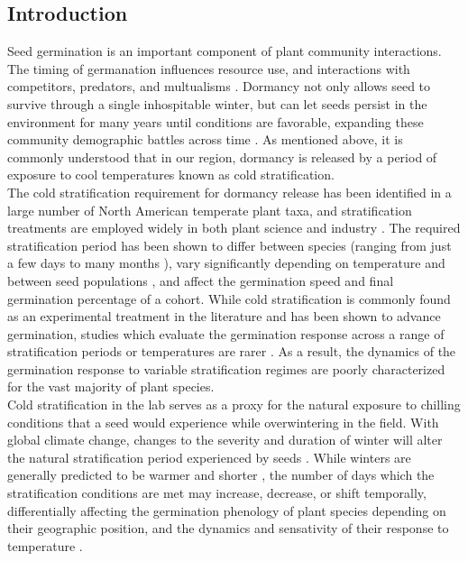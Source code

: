 \documentclass[12pt]{article}\usepackage[]{graphicx}\usepackage[]{color}
\begin{document}
\subsection*{Introduction}
\indent\indent Seed germination is an important component of plant community interactions. The timing of germanation influences resource use, and interactions with competitors, predators, and multualisms \citep{Korner2008,Rathcke1985,Gioria2018}. Dormancy not only allows seed to survive through a single inhospitable winter, but can let seeds persist in the environment for many years until conditions are favorable, expanding these community demographic battles across time \citep{Long2015}. As mentioned above, it is commonly understood that in our region, dormancy is released by a period of exposure to cool temperatures known as cold stratification.\\
\indent\indent The cold stratification requirement for dormancy release has been identified in a large number of North American temperate plant taxa, and stratification treatments are employed widely in both plant science and industry \citep{Hartmann_2011}. The required stratification period has been shown to differ between species (ranging from just a few days to many months \citep{Luna2009}), vary significantly depending on temperature and between seed populations \citep{Steadman2004}, and affect the germination speed and final germination percentage of a cohort. While cold stratification is commonly found as an experimental treatment in the literature and has been shown to advance germination, studies which evaluate the germination response across a range of stratification periods or temperatures are rarer \citep{Batlla2009}. As a result, the dynamics of the germination response to variable stratification regimes are poorly characterized for the vast majority of plant species.\\
\indent Cold stratification in the lab serves as a proxy for the natural exposure to chilling conditions that a seed would experience while overwintering in the field. With global climate change, changes to the severity and duration of winter will alter the natural stratification period experienced by seeds \citep{Walck2011}. While winters are generally predicted to be warmer and shorter \citep{IPCC_2014}, the number of days which the stratification conditions are met may increase, decrease, or shift temporally, differentially affecting the germination phenology of plant species depending on their geographic position, and the dynamics and sensativity of their response to temperature \citep{Walck2011}. \\
\end{document}
